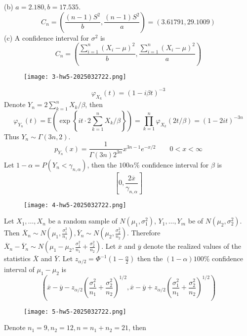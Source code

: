 (b) $a=2.180,b=17.535$.
\[
C_n=\left( \frac{(n-1)S^2}{b}  , \frac{(n-1)S^2}{a} \right)=(3.61791,29.1009)
\]
(c)
A confidence interval for $\sigma^{2}$ is
\[
C_n=\left( \frac{\sum_{i=1}^{n} (X_i-\mu)^2}{b},\frac{\sum_{i=1}^{n} (X_i-\mu)^2}{a} \right)
\]
\begin{exercise}
\begin{figure}[H]
\centering
\texttt{[image: 3-hw5-2025032722.png]}
\label{}
\end{figure}
\end{exercise}
\[
\varphi_{X_k}(t)=(1-i\beta t)^{-3}
\]
Denote $Y_n=2\sum_{k=1}^{n}X_{k}/\beta$, then
\[
\varphi_{Y_n}(t)=\mathbb{E}\left( \exp \left\{  it\cdot 2\sum_{k=1}^{n} X_k/\beta  \right\} \right)=\prod_{k=1}^{n} \varphi_{X_k}(2t/\beta)
=(1-2it)^{-3n}
\]
Thus $Y_n\sim\Gamma(3n,2)$.
\[
p_{Y_n}(x)=\frac{1}{\Gamma(3n)2^{3n}}x^{3n-1}e^{ -x/2  }\qquad 0<x<\infty
\]
Let $1-\alpha=P(Y_n<\gamma_{n,\alpha})$, then the $100\alpha\%$ confidence interval for $\beta$ is
\[
\left[ 0,\frac{2\overline{x}}{\gamma_{n,\alpha}} \right]
\]
\begin{exercise}
\begin{figure}[H]
\centering
\texttt{[image: 4-hw5-2025032722.png]}
\label{}
\end{figure}
\end{exercise}
Let $X_1,\dots,X_n$ be a random sample of $N(\mu_1,\sigma_1^2)$, $Y_1,\dots ,Y_m$ be of $N(\mu_2,\sigma_2^2)$. Then $\overline{X}_n\sim N\left( \mu_1,\frac{\sigma_1^2}{n_1} \right),\overline{Y}_n\sim N\left( \mu_2,\frac{\sigma^{2}_{2}}{n_2} \right)$. Therefore $\overline{X}_n-\overline{Y}_n\sim N\left( \mu_1-\mu_2,\frac{\sigma_1^2}{n_1}+\frac{\sigma_2^2}{n_2} \right)$. Let $\overline{x}$ and $\overline{y}$ denote the realized values of the statistics $\overline{X}$ and $\overline{Y}$. Let $z_{\alpha/2 }=\Phi ^{-1}\left( 1-\frac{\alpha}{2} \right)$ then the $(1-\alpha) 100\%$ confidence interval of $\mu_1-\mu_2$ is
\[
\left( \overline{x}-\overline{y}-z_{\alpha/2 }\left( \frac{\sigma_1^2}{n_1}+\frac{\sigma_2^2}{n_2} \right)^{1/2},\overline{x}-\overline{y}+z_{\alpha/2 }\left( \frac{\sigma_1^2}{n_1} +\frac{\sigma_2^2}{n_2}\right)^{1/2} \right)
\]
\begin{exercise}
\begin{figure}[H]
\centering
\texttt{[image: 5-hw5-2025032722.png]}
\label{}
\end{figure}
\end{exercise}
Denote $n_1=9,n_2=12,n=n_1+n_2=21$, then
